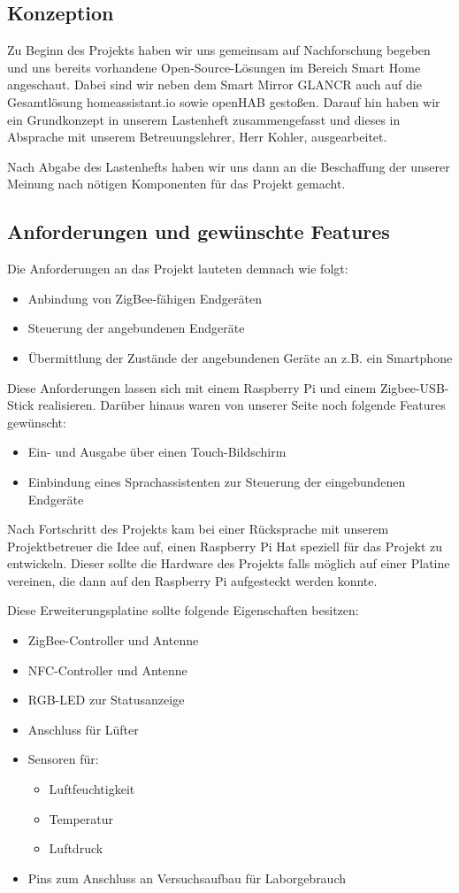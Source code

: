 \documentclass[12pt,a4paper]{article}
\begin{document}
	\subsection{Konzeption}
	Zu Beginn des Projekts haben wir uns gemeinsam auf Nachforschung begeben und uns bereits vorhandene Open-Source-Lösungen im Bereich Smart Home angeschaut. Dabei sind wir neben dem Smart Mirror GLANCR auch auf die Gesamtlösung homeassistant.io sowie openHAB gestoßen. Darauf hin haben wir ein Grundkonzept in unserem Lastenheft zusammengefasst und dieses in Absprache mit unserem Betreuungslehrer, Herr Kohler, ausgearbeitet.\par
	Nach Abgabe des Lastenhefts haben wir uns dann an die Beschaffung der unserer Meinung nach nötigen Komponenten für das Projekt gemacht.
	\subsection{Anforderungen und gewünschte Features}
	Die Anforderungen an das Projekt lauteten demnach wie folgt:
	\begin{itemize}
		\item Anbindung von ZigBee-fähigen Endgeräten
		\item Steuerung der angebundenen Endgeräte
		\item Übermittlung der Zustände der angebundenen Geräte an z.B. ein Smartphone
	\end{itemize}
	Diese Anforderungen lassen sich mit einem Raspberry Pi und einem Zigbee-USB-Stick realisieren. Darüber hinaus waren von unserer Seite noch folgende Features gewünscht:
	\begin{itemize}
		\item Ein- und Ausgabe über einen Touch-Bildschirm
		\item Einbindung eines Sprachassistenten zur Steuerung der eingebundenen Endgeräte
	\end{itemize}
	Nach Fortschritt des Projekts kam bei einer Rücksprache mit unserem Projektbetreuer die Idee auf, einen Raspberry Pi Hat speziell für das Projekt zu entwickeln. Dieser sollte die Hardware des Projekts falls möglich auf einer Platine vereinen, die dann auf den Raspberry Pi aufgesteckt werden konnte.\par
	Diese Erweiterungsplatine sollte folgende Eigenschaften besitzen:
	\begin{itemize}
		\item ZigBee-Controller und Antenne
		\item NFC-Controller und Antenne
		\item RGB-LED zur Statusanzeige
		\item Anschluss für Lüfter
		\item Sensoren für:
		\begin{itemize}
			 \item Luftfeuchtigkeit
			 \item Temperatur
			 \item Luftdruck
		\end{itemize}
		\item Pins zum Anschluss an Versuchsaufbau für Laborgebrauch
	\end{itemize}
\end{document}
